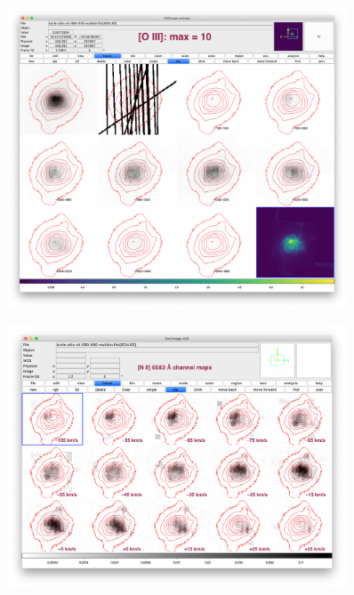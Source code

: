 \documentclass{aa}
\begin{document}
\begin{figure}[!t]
\centering
\includegraphics[width=0.9\textwidth]{turtle-oiii-bright.png}
  \caption{  }
\end{figure}

\begin{figure}[!t]
\centering
\includegraphics[width=0.9\textwidth]{nii-will.png}
  \caption{  }
\end{figure}
\end{document}
